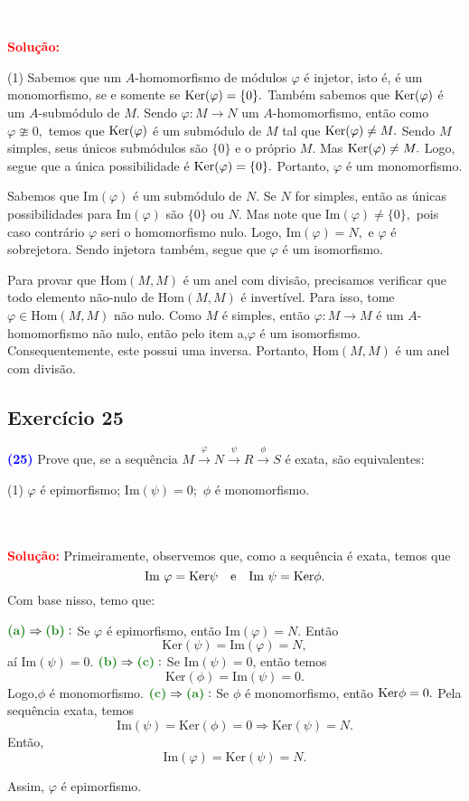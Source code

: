 \documentclass[11pt,a4paper]{article}
\newcommand{\exercicio}[1]{\subsection{Exercício #1} \textcolor{blue}{\bf(#1)}}
\newcommand{\dividiritens}[1]{\begin{tasks}[counter-format={(tsk[a])},label-width=3.6ex, label-format = {\bfseries}, column-sep = {0pt}](1) #1 \end{tasks}}
\newcommand{\pers}[1]{\textcolor{Floresta}{$\negrito{(#1)} $}}
\newcommand{\solucao}[1]{
\textbf{\textcolor{white}{oi}\\ \\ \textcolor{red}{Solução:}} #1}
\begin{document}
\solucao{
\dividiritens{
\task[\pers{a}] Sabemos que um $A$-homomorfismo de módulos $\varphi$ é injetor, isto é, é um monomorfismo, se e somente se ${\rm Ker}(\varphi) = \{ 0 \}.$ Também sabemos que ${\rm Ker}(\varphi)$ é um $A$-submódulo de $M.$ Sendo $\varphi \colon M \to N$ um $A$-homomorfismo, então como $\varphi \ncong 0,$ temos que ${\rm Ker}(\varphi)$ é um submódulo de $M$ tal que ${\rm Ker}(\varphi) \neq M.$ Sendo $M$ simples, seus únicos submódulos são $\{ 0\}$ e o próprio $M.$ Mas ${\rm Ker}(\varphi) \neq M.$ Logo, segue que a única possibilidade é ${\rm Ker}(\varphi) = \{ 0 \}.$ Portanto, $\varphi$ é um monomorfismo.

Sabemos que $\mbox{Im}(\varphi)$ é um submódulo de $N.$ Se $N$ for simples, então as únicas possibilidades para $\mbox{Im}(\varphi)$ são $\{ 0 \}$ ou $N.$ Mas note que $\mbox{Im}(\varphi) \neq \{ 0 \},$ pois caso contrário $\varphi$ seri o homomorfismo nulo. Logo, $\mbox{Im}(\varphi) = N,$ e $\varphi$ é sobrejetora. Sendo injetora também, segue que $\varphi$ é um isomorfismo.

\task[\pers{b}] Para provar que $\mbox{Hom}(M, M)$ é um anel com divisão, precisamos verificar que todo elemento não-nulo de $\mbox{Hom}(M, M)$ é invertível. Para isso, tome $\varphi \in \mbox{Hom}(M, M)$ não nulo. Como $M$ é simples, então $\varphi \colon M \to M$ é um $A$-homomorfismo não nulo, então pelo item a,$\varphi$ é um isomorfismo. Consequentemente, este possui uma inversa. Portanto,  $\mbox{Hom}(M, M)$ é um anel com divisão.
}


}
\exercicio{25} Prove que, se a sequência $M \xrightarrow{\varphi} N \xrightarrow{\psi} R \xrightarrow{\phi} S$ é exata, são equivalentes:
\dividiritens{
\task[\pers{a}] $\varphi$ é epimorfismo;
\task[\pers{b}] $\mbox{Im}(\psi) = 0;$
\task[\pers{c}] $\phi$ é monomorfismo.
}
\solucao{
Primeiramente, observemos que, como a sequência é exata, temos que
\[
\mbox{Im } \varphi = {\rm Ker} \psi \quad \mbox{e} \quad \mbox{Im } \psi = {\rm Ker} \phi.
\]
Com base nisso, temo que:

$\textbf{\textcolor{Floresta}{(a)}} \Rightarrow \textbf{\textcolor{Floresta}{(b)}}:$ Se $\varphi$ é epimorfismo, então $\mbox{Im}(\varphi)=N.$ Então \[\mbox{Ker}(\psi)=\mbox{Im}(\varphi)=N,\] aí $\mbox{Im}(\psi)=0$.
\medskip
\noindent
$\textbf{\textcolor{Floresta}{(b)}} \Rightarrow \textbf{\textcolor{Floresta}{(c)}}:$
Se $\mbox{Im}(\psi)=0$, então temos \[\mbox{Ker}(\phi)=\mbox{Im}(\psi)=0.\]
Logo,$\phi$ é monomorfismo.
\medskip
\noindent
$\textbf{\textcolor{Floresta}{(c)}} \Rightarrow \textbf{\textcolor{Floresta}{(a)}}:$ Se $\phi$ é monomorfismo, então ${\rm Ker} \phi = 0.$ Pela sequência exata, temos
\[\mbox{Im}(\psi)=\mbox{Ker}(\phi)=0 \Rightarrow \mbox{Ker}(\psi)=N.\]
Então, \[\mbox{Im}(\varphi)=\mbox{Ker}(\psi)=N.\] 

Assim, $\varphi$ é epimorfismo.
}
\end{document}
